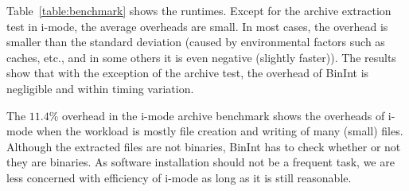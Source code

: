 Table~\ref{table:benchmark} shows the runtimes.
Except for the archive extraction test in i-mode,
the average overheads are small.
In most cases, the overhead is smaller than the standard deviation
(caused by environmental factors such as caches, etc., and in some
others it is even negative (slightly faster)).
The results show that with the exception of the archive test, 
the overhead of BinInt is negligible and within timing variation.

The $11.4\%$ overhead in the i-mode archive benchmark
shows the overheads of i-mode when the workload is mostly file creation
and writing of many (small) files.
Although the extracted files are not binaries, BinInt
has to check whether or not they are binaries.
As software installation should not be a frequent task,
we are less concerned with efficiency of
i-mode as long as it is still reasonable.
